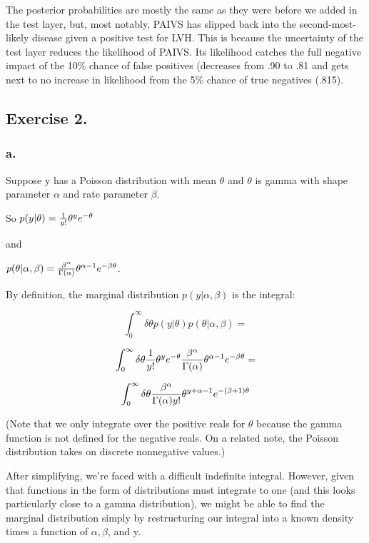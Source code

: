 \documentclass{article}
\begin{document}
The posterior probabilities are mostly the same as they were before we 
added in the test layer, but, most notably, PAIVS has slipped
back into the second-most-likely disease given a positive test for LVH. This
is because the uncertainty of the test layer reduces the likelihood of PAIVS.
Its likelihood catches the full negative impact of the 10\% chance of false positives 
(decreases from .90 to .81 and gets
next to no increase in likelihood from 
the 5\% chance of true negatives (.815).

\subsection{Exercise 2.}

\subsubsection{a.} 
Suppose y has a Poisson distribution with mean \(\theta\) and \(\theta\) is
gamma with shape parameter \(\alpha\) and rate parameter \(\beta\).

So \(p(y \vert \theta) = {1 \over y!}\theta^y e^{-\theta}\) 

and

\(p(\theta \vert \alpha, \beta) = {\beta^{\alpha} \over \Gamma(\alpha)}\theta^{\alpha - 1}e^{-\beta\theta}\).

By definition, the marginal distribution \(p(y \vert \alpha, \beta)\) is the integral:


\[\int_{0}^{\infty} \delta\theta p(y \vert \theta)p(\theta \vert \alpha, \beta) = \]

\[\int_{0}^{\infty} \delta\theta {1 \over y!}\theta^y e^{-\theta}{\beta^{\alpha} \over \Gamma(\alpha)}\theta^{\alpha - 1}e^{-\beta\theta} =\]

\begin{equation}
\int_{0}^{\infty} \delta\theta {\beta^{\alpha} \over \Gamma(\alpha) y!} \theta^{y + \alpha - 1} e^{-(\beta + 1)\theta}
\end{equation}

(Note that we only integrate over the positive reals for \(\theta\) because the gamma function
is not defined for the negative reals. On a related note, the Poisson distribution takes on discrete
nonnegative values.)

After simplifying, we're faced with a difficult indefinite integral. However, given that functions in the form of distributions
must integrate to one (and this looks particularly close to a gamma distribution), we might be able to find the 
marginal distribution simply by restructuring our integral into a known density times a function of \(\alpha, \beta\), and y.
\end{document}
